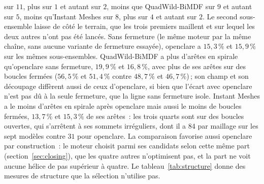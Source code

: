 \documentclass[11pt,a4paper]{article}
\begin{document}
sur $11$, plus sur $1$ et autant sur $2$, moins que QuadWild-BiMDF sur $9$ et
autant sur $5$, moins qu'Instant Meshes sur $8$, plus sur $4$ et autant sur
$2$. Le second sous-ensemble laisse de côté
le terrain, que les trois premiers maillent et sur lequel les deux autres
n'ont pas été lancés. Sans fermeture (le même moteur par la même chaîne,
sans aucune variante de fermeture essayée), openclare a $15,3\,\%$ et
$15,9\,\%$ sur les mêmes sous-ensembles. QuadWild-BiMDF a plus d'arêtes en
spirale qu'openclare sans fermeture, $19,9\,\%$ et $16,8\,\%$, avec plus de ses arêtes sur des boucles
fermées ($56,5\,\%$ et $51,4\,\%$ contre $48,7\,\%$ et $46,7\,\%$)\,; son
champ et son découpage diffèrent aussi de ceux d'openclare, si bien que
l'écart avec openclare n'est pas dû à la seule fermeture, que la ligne sans
fermeture isole. Instant Meshes a le moins d'arêtes en spirale après
openclare mais aussi le moins de boucles fermées, $13,7\,\%$ et $15,3\,\%$
de ses arêtes~: les trois quarts sont sur des boucles ouvertes, qui
s'arrêtent à ses sommets irréguliers, dont il a $84$ par maillage sur les
sept modèles contre $31$ pour openclare. La comparaison favorise aussi
openclare par construction~: le moteur choisit parmi ses candidats selon
cette même part (section~\ref{sec:closing}), que les quatre autres
n'optimisent pas, et la part ne voit aucune hélice de pas supérieur à
quatre. Le tableau~\ref{tab:structure} donne des mesures de structure que la
sélection n'utilise pas.
\end{document}
